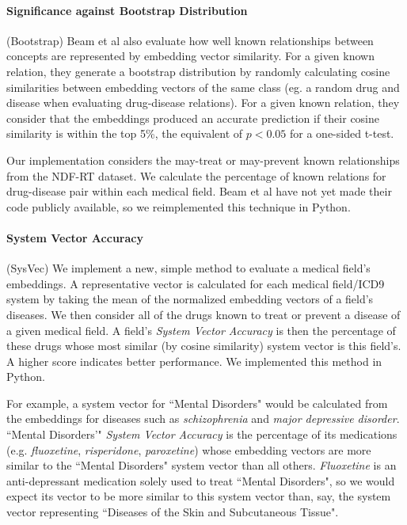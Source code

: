 \documentclass[11pt,a4paper]{article}
\begin{document}
\paragraph{Significance against Bootstrap Distribution}(Bootstrap)
Beam et al  also evaluate how well known relationships between concepts are represented by embedding vector similarity. For a given known relation, they generate a bootstrap distribution by randomly calculating cosine similarities between embedding vectors of the same class (eg. a random drug and disease when evaluating  drug-disease relations). For a given known relation, they consider that the embeddings produced an accurate prediction if their cosine similarity is within the top 5\%, the equivalent of $p<0.05$ for a one-sided t-test. 

Our implementation considers the may-treat or may-prevent known relationships from the NDF-RT dataset. We calculate the percentage of known relations for drug-disease pair within each medical field. Beam et al have not yet made their code publicly available, so we reimplemented this technique in Python. 

\paragraph{System Vector Accuracy}(SysVec)
We implement a new, simple method to evaluate a medical field's embeddings. A representative vector is calculated for each medical field/ICD9 system by taking the mean of the normalized embedding vectors of a field's diseases. We then consider all of the drugs known to treat or prevent a disease of a given medical field. A field's \emph{System Vector Accuracy} is then the percentage of these drugs whose most similar (by cosine similarity) system vector is this field's. A higher score indicates better performance. We implemented this method in Python. 

For example, a system vector for ``Mental Disorders" would be calculated from the embeddings for diseases such as \emph{schizophrenia} and \emph{major depressive disorder}. ``Mental Disorders'" \emph{System Vector Accuracy} is the percentage of its medications (e.g. \emph{fluoxetine}, \emph{risperidone}, \emph{paroxetine}) whose embedding vectors are more similar to the ``Mental Disorders" system vector than all others. \emph{Fluoxetine} is an anti-depressant medication solely used to treat ``Mental Disorders", so we would expect its vector to be more similar to this system vector than, say, the system vector representing ``Diseases of the Skin and Subcutaneous Tissue". 
\end{document}
